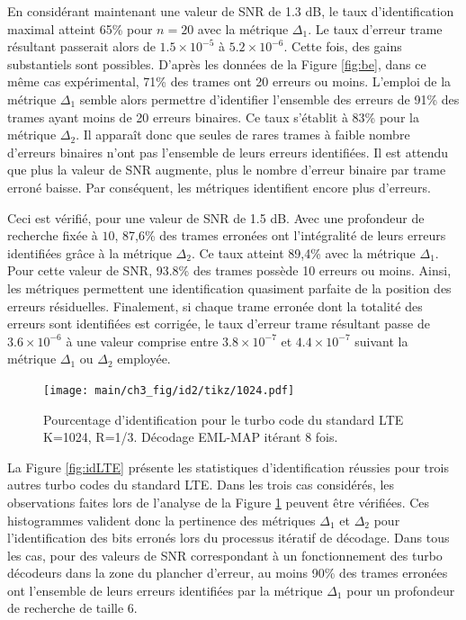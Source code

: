 En considérant maintenant une valeur de SNR de 1.3 dB, le taux d'identification maximal atteint 65\% pour $n=20$ avec la 
métrique $\Delta_1$. Le taux d'erreur trame résultant passerait alors de 
$1.5\times 10^{-5}$ à $5.2\times 10^{-6}$. Cette fois, des gains substantiels sont possibles. D'après les données de la 
Figure \ref{fig:be}, dans ce même cas expérimental, 71\% des trames ont 20 erreurs ou moins. 
L'emploi de la métrique $\Delta_1$ semble alors permettre d'identifier l'ensemble des erreurs de 91\% des trames ayant 
moins de 20 erreurs binaires. Ce taux s'établit à 83\% pour la métrique $\Delta_2$. 
Il apparaît donc que seules de rares trames à faible nombre d'erreurs binaires n'ont pas l'ensemble de leurs erreurs
identifiées. Il est attendu que plus la valeur de SNR augmente, plus le nombre d'erreur binaire par trame erroné 
baisse. Par conséquent, les métriques identifient encore plus d'erreurs.

Ceci est vérifié, pour une valeur de SNR de 1.5 dB. Avec une profondeur de recherche fixée à $10$, 87,6\% des 
trames erronées ont l'intégralité de leurs erreurs identifiées grâce à la métrique $\Delta_2$. Ce taux atteint 89,4\% avec 
la métrique $\Delta_1$. Pour cette valeur de SNR, 93.8\% des trames possède 10 erreurs ou moins. Ainsi, les métriques 
permettent une identification quasiment parfaite de la position des erreurs résiduelles. Finalement, si chaque trame 
erronée dont la totalité des erreurs sont identifiées est corrigée, le taux d'erreur trame résultant passe de 
$3.6\times 10^{-6}$ à une valeur comprise entre $3.8\times 10^{-7}$ et $4.4\times 10^{-7}$ suivant la métrique $\Delta_1$ 
ou $\Delta_2$ employée.

\begin{figure}[!htb]
	\centering
	\texttt{[image: main/ch3\_fig/id2/tikz/1024.pdf]}
	\caption{Pourcentage d'identification pour le turbo code du standard LTE K=1024, R=1/3.
	Décodage EML-MAP itérant 8 fois. \label{fig:id1024}}
\end{figure}
La Figure \ref{fig:idLTE} présente les statistiques d'identification réussies pour trois autres turbo codes du standard 
LTE. Dans les trois cas considérés, les observations faites lors de l'analyse de la Figure \ref{fig:id1024} peuvent être 
vérifiées. Ces histogrammes valident donc la pertinence des métriques $\Delta_1$ et $\Delta_2$ pour l'identification des bits 
erronés lors du processus itératif de décodage. Dans tous les cas, pour des valeurs de SNR correspondant à un fonctionnement des 
turbo décodeurs dans la zone du plancher d'erreur, au moins 90\% des trames erronées ont l'ensemble de leurs erreurs 
identifiées par la métrique $\Delta_1$ pour un profondeur de recherche de taille 6.

